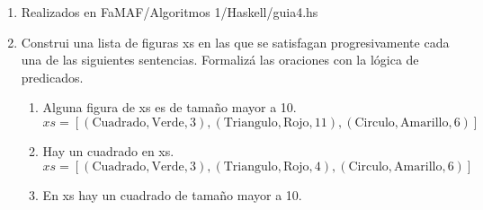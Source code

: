 \documentclass[12pt]{article} %
\begin{document}
\begin{enumerate}
    \item Realizados en FaMAF/Algoritmos 1/Haskell/guia4.hs
    \item Construi una lista de figuras xs en las que se satisfagan progresivamente cada una de las siguientes
    sentencias. Formalizá las oraciones con la lógica de predicados.
    \begin{enumerate}
        \item Alguna figura de xs es de tamaño mayor a 10. \\
        \( xs = [(\text{Cuadrado}, \text{Verde}, 3),(\text{Triangulo}, \text{Rojo}, 11), (\text{Circulo}, \text{Amarillo}, 6)] \) 
        \item Hay un cuadrado en xs. \\
        \( xs = [(\text{Cuadrado}, \text{Verde}, 3),(\text{Triangulo}, \text{Rojo}, 4), (\text{Circulo}, \text{Amarillo}, 6)] \)
        \item En xs hay un cuadrado de tamaño mayor a 10.
    \end{enumerate}
\end{enumerate}
\end{document}
